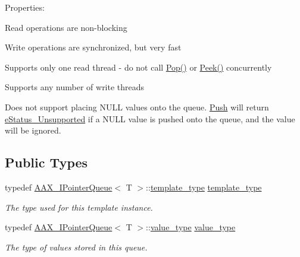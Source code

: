 Properties\+:
\begin{DoxyItemize}
\item Read operations are non-\/blocking
\item Write operations are synchronized, but very fast
\item Supports only one read thread -\/ do not call \hyperlink{a00010_a0c64180813c16b4952761f82e32d7edd}{Pop()} or \hyperlink{a00010_a0b82e81edc0d63a81c1b41acaf2a493d}{Peek()} concurrently
\item Supports any number of write threads
\item Does not support placing {\ttfamily N\+U\+L\+L} values onto the queue. \hyperlink{a00010_a2304d6ba1f1026b6a42de48056ab3050}{Push} will return \hyperlink{a00089_aea020100f0b06636ce7cb25c2fdb0af7a1585c38bb587c4adcadefbe3823ee9f8}{e\+Status\+\_\+\+Unsupported} if a {\ttfamily N\+U\+L\+L} value is pushed onto the queue, and the value will be ignored. 
\end{DoxyItemize}\subsection*{Public Types}
\begin{DoxyCompactItemize}
\item 
typedef \hyperlink{a00110}{A\+A\+X\+\_\+\+I\+Pointer\+Queue}$<$ T $>$\+::\hyperlink{a00010_aae36349d9419de62ce8e74b397749c27}{template\+\_\+type} \hyperlink{a00010_aae36349d9419de62ce8e74b397749c27}{template\+\_\+type}
\begin{DoxyCompactList}\small\item\em The type used for this template instance. \end{DoxyCompactList}\item 
typedef \hyperlink{a00110}{A\+A\+X\+\_\+\+I\+Pointer\+Queue}$<$ T $>$\+::\hyperlink{a00010_acbb95bad3be34c7e4c770bc8c455c252}{value\+\_\+type} \hyperlink{a00010_acbb95bad3be34c7e4c770bc8c455c252}{value\+\_\+type}
\begin{DoxyCompactList}\small\item\em The type of values stored in this queue. \end{DoxyCompactList}\end{DoxyCompactItemize}

